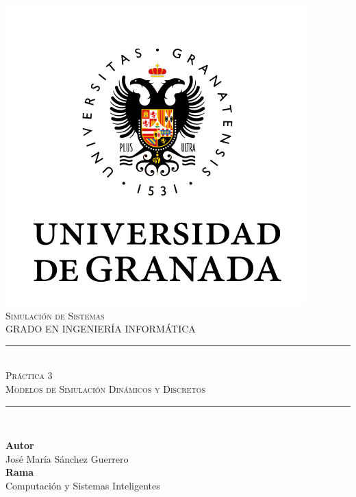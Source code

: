 \documentclass[11pt,a4paper]{report}
\newcommand{\asignatura}{Simulación de Sistemas}
\newcommand{\autor}{José María Sánchez Guerrero}
\newcommand{\titulo}{Práctica 3}
\newcommand{\subtitulo}{Modelos de Simulación Dinámicos y Discretos}
\begin{document}

\begin{titlepage}

\begin{minipage}{\textwidth}

\centering

\includegraphics[scale=0.5]{img/ugr.png}\\

\textsc{\Large \asignatura{}\\[0.2cm]}
\textsc{GRADO EN INGENIERÍA INFORMÁTICA}\\[1cm]

\noindent\rule[-1ex]{\textwidth}{1pt}\\[1.5ex]
\textsc{{\Huge \titulo\\[0.5ex]}}
\textsc{{\Large \subtitulo\\}}
\noindent\rule[-1ex]{\textwidth}{2pt}\\[3.5ex]

\end{minipage}

\vspace{0.5cm}

\begin{minipage}{\textwidth}

\centering

\textbf{Autor}\\ {\autor{}}\\[2.5ex]
\textbf{Rama}\\ {Computación y Sistemas Inteligentes}\\[2.5ex]
\vspace{0.3cm}


\end{minipage}
\end{titlepage}
\end{document}
